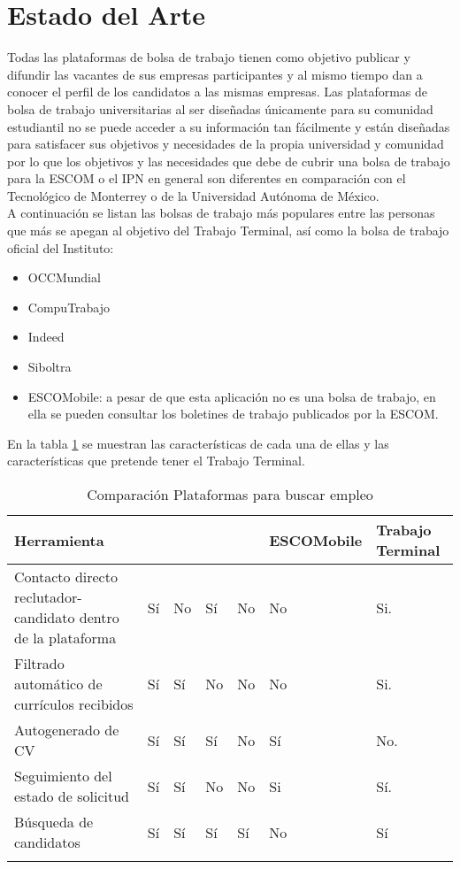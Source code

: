 \clearpage
\section{Estado del Arte}
Todas las plataformas de bolsa de trabajo tienen como objetivo publicar y difundir las vacantes de sus empresas participantes y al mismo tiempo dan a conocer el perfil de los candidatos a las mismas empresas.
Las plataformas de bolsa de trabajo universitarias al ser diseñadas únicamente para su comunidad estudiantil no se puede acceder 
a su información tan fácilmente y están diseñadas para satisfacer sus objetivos y necesidades de la propia universidad y comunidad por lo que los objetivos y las necesidades que debe de cubrir una bolsa de trabajo para la ESCOM o  el IPN en general son diferentes en comparación con el Tecnológico de Monterrey o de la Universidad Autónoma de México.\\
\newline
A continuación se listan las bolsas de trabajo más populares entre las personas que más se apegan al objetivo del Trabajo Terminal,
 así como  la bolsa de trabajo oficial del Instituto:
\begin{itemize}
    \item OCCMundial
    \item CompuTrabajo
    \item Indeed
    \item Siboltra 
    \item ESCOMobile: a pesar de que esta aplicación no es una bolsa de trabajo, en ella se pueden consultar los boletines de trabajo
    publicados por la ESCOM.
\end{itemize}
En la tabla \ref{table:herramientasSimilares} se muestran las características de cada una de ellas y las características que pretende tener el Trabajo Terminal.


\begin{longtable}{| p{}  | p{} | p{}  | p{}  | p{}  | p{}  |  p{}  |}

    \hline

    \textbf{Herramienta} & \IUocc{}	& \IUcompuT{}&  \IUIneed{} & \IUsisae{} & \scriptsize \textbf{ESCOMobile} & \scriptsize Trabajo Terminal\\ 
    \hline

    Contacto directo reclutador-candidato dentro de la plataforma & Sí & No  & Sí  & No  & No & Si.\\ \hline
    Filtrado automático de currículos recibidos & Sí & Sí & No & No & No & Si.\\ \hline
    Autogenerado de CV & Sí & Sí & Sí  & No & Sí & No. \\ \hline
    Seguimiento del estado de solicitud & Sí  & Sí & No & No  & Si& Sí. \\ \hline
    Búsqueda de candidatos & Sí & Sí & Sí & Sí & No & Sí\\ \hline

    \caption{Comparación Plataformas para buscar empleo}
    \label{table:herramientasSimilares}
\end{longtable}

